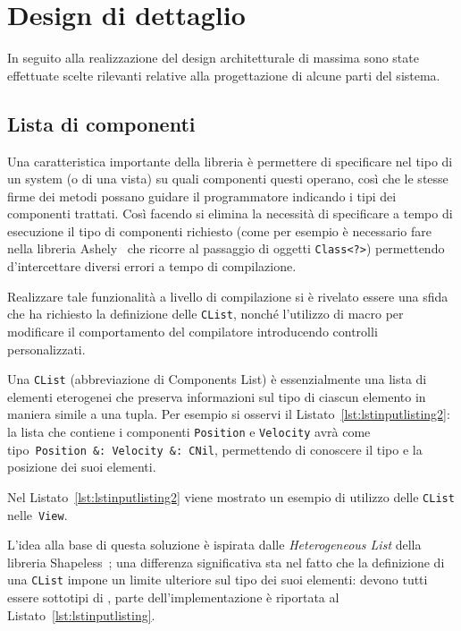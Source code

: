 \chapter{Design di dettaglio}\label{ch:design-di-dettaglio}
In seguito alla realizzazione del design architetturale di massima sono state effettuate scelte rilevanti
relative alla progettazione di alcune parti del sistema.

\section{Lista di componenti}\label{sec:lista-di-componenti}
Una caratteristica importante della libreria è permettere di specificare nel tipo di un system (o di una vista)
su quali componenti questi operano, così che le stesse firme dei metodi possano guidare il programmatore indicando i
tipi dei componenti trattati.
Così facendo si elimina la necessità di specificare a tempo di esecuzione il tipo di componenti richiesto (come per
esempio è necessario fare nella libreria Ashely~\cite{ashley} che ricorre al passaggio di oggetti \texttt{Class<?>})
permettendo d'intercettare diversi errori a tempo di compilazione.

Realizzare tale funzionalità a livello di compilazione si è rivelato essere una sfida che ha richiesto la definizione
delle \texttt{CList}, nonché l’utilizzo di macro per modificare il comportamento del compilatore introducendo controlli
personalizzati.

Una \texttt{CList} (abbreviazione di Components List) è essenzialmente una lista di elementi eterogenei che preserva
informazioni sul tipo di ciascun elemento in maniera simile a una tupla.
Per esempio si osservi il Listato~\ref{lst:lstinputlisting2}: la lista che contiene
i componenti \texttt{Position} e \texttt{Velocity} avrà come tipo~\texttt{Position~\&:~Velocity~\&:~CNil}, permettendo
di conoscere il tipo e la posizione dei suoi elementi.

Nel Listato~\ref{lst:lstinputlisting2} viene mostrato un esempio di utilizzo delle \texttt{CList} nelle~\texttt{View}.


L’idea alla base di questa soluzione è ispirata dalle \textit{Heterogeneous List} della libreria
Shapeless~\cite{shapeless}; una differenza significativa sta nel fatto che la definizione di una \texttt{CList} impone un
limite ulteriore sul tipo dei suoi elementi: devono tutti essere sottotipi di \Component, parte dell’implementazione è
riportata al Listato~\ref{lst:lstinputlisting}.

